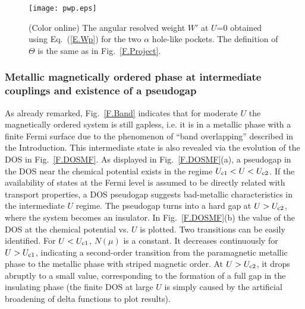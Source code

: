 \documentclass[aps,prb,superscriptaddress,preprintnumbers,
showpacs,legalpaper,twoside,twocolumn,amsmath,amssymb]{revtex4}
\begin{document}
\begin{figure}
\begin{center}
\vskip -0.3cm
\centerline{\texttt{[image: pwp.eps]}}
\vskip -0.5cm
%
\caption{(Color online) The angular resolved weight $W'$ at $U$=0
obtained using
Eq.~(\ref{E.Wp}) for the two $\alpha$ hole-like pockets. The
definition of $\Theta$ is the same as in
Fig.~\ref{F.Project}.}
\vskip -0.7cm
\label{F.Wp}
\end{center}
\end{figure}




\subsubsection{Metallic magnetically ordered phase at intermediate couplings and
existence of a pseudogap}

As already remarked,
Fig.~\ref{F.Band} indicates that for moderate $U$ the
magnetically ordered system is still gapless, i.e. it is in a metallic
phase with a finite Fermi surface due to the phenomenon
of ``band overlapping''
described in the Introduction. This intermediate state is also revealed via the
evolution of the DOS in Fig.~\ref{F.DOSMF}. As displayed in
Fig.~\ref{F.DOSMF}(a), a pseudogap in the DOS near the chemical
potential exists in the regime $U_{\rm c1}<U<U_{\rm c2}$. If the availability
of states at the Fermi level is assumed to be directly related with transport
properties, a DOS pseudogap suggests bad-metallic
characteristics in the intermediate $U$ regime. The pseudogap turns into a hard gap
at $U>U_{\rm c2}$, where the system becomes an insulator.
In Fig.~\ref{F.DOSMF}(b) the value of the DOS at the
chemical potential vs. $U$ is plotted.
Two transitions can be easily identified. For
$U<U_{\rm c1}$, $N(\mu)$ is a constant. It decreases continuously
for $U>U_{\rm c1}$, indicating a second-order transition from the
paramagnetic metallic phase to the metallic phase with striped
magnetic order. At $U>U_{\rm c2}$, it drops abruptly to a small value,
corresponding to the formation of a full gap in the insulating
phase (the finite DOS at large $U$ is simply caused by the
artificial broadening of delta functions to plot results).
\end{document}
